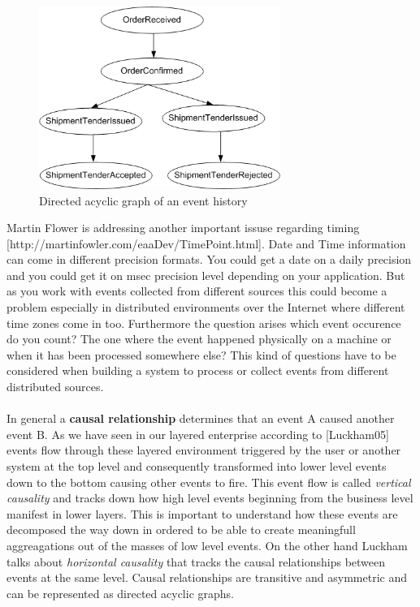 \documentclass[a4paper,titlepage,11pt,DIV10,BCOR0.5cm,headinclude]{article}
\begin{document}
\begin{figure} [!h]                
	\centering                                           
	\includegraphics[width=0.7\textwidth]{pics/acyclicEventGraph.jpg}
	\caption{Directed acyclic graph of an event history}             
	\label{fig:dag}
\end{figure}  
Martin Flower is addressing another important issuse regarding timing [http://martinfowler.com/eaaDev/TimePoint.html]. Date and Time information can come in different  precision formats. You could get a date on a daily precision and you could get it on msec precision level depending on your application. But as you work with events collected from different sources this could become a problem especially in distributed environments over the Internet where different time zones come in too. Furthermore the question arises which event occurence do you count? The one where the event happened physically on a machine or when it has been processed somewhere else? This kind of questions have to be considered when building a system to process or collect events from different distributed sources.
\\\\ 
In general a \textbf{causal relationship} determines that an event A caused another event B. As we have seen in our layered enterprise according to [Luckham05] events flow through these layered environment triggered by the user or another system at the top level and consequently transformed into lower level events down to the bottom causing other events to fire. This event flow is called \textit{vertical causality} and tracks down how high level events beginning from the business level manifest in lower layers. This is important to understand how these events are decomposed the way down in ordered to be able to create meaningfull aggreagations out of the masses of low level events. On the other hand Luckham talks about \textit{horizontal causality} that tracks the causal relationships between events at the same level. Causal relationships are transitive and asymmetric and can be represented as directed acyclic graphs. 
\end{document}
